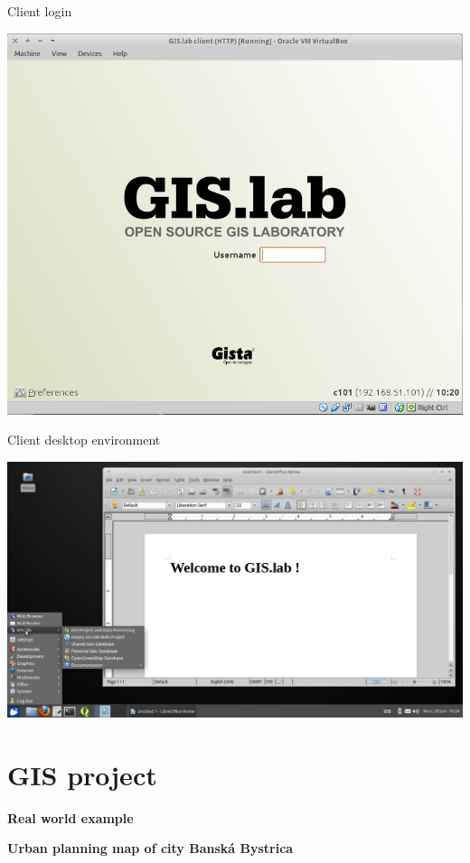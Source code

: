 \documentclass[12pt]{beamer}
\begin{document}
\begin{frame}{Client login}
	\begin{center}
		\includegraphics[keepaspectratio=true,height=0.7\textheight]{images/real-world-example/client-login.png}
	\end{center}
\end{frame}


\begin{frame}{Client desktop environment}
	\begin{center}
		\includegraphics[keepaspectratio=true,height=0.7\textheight]{images/real-world-example/client-desktop-libreoffice.png}
	\end{center}
\end{frame}


\section{GIS project}
\begin{frame}
	\begin{center}
		\LARGE\textbf{Real world example}\normalsize

		\textbf{Urban planning map of city Banská Bystrica}
	\end{center}
\end{frame}
\end{document}
